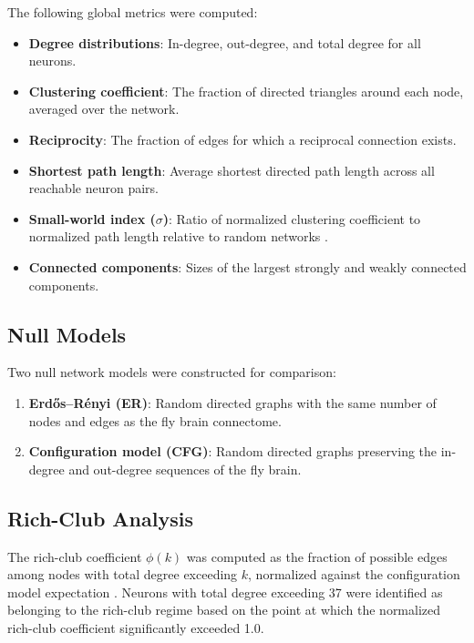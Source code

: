 \documentclass[11pt]{article}
\begin{document}
The following global metrics were computed:
\begin{itemize}
    \item \textbf{Degree distributions}: In-degree, out-degree, and total degree for all neurons.
    \item \textbf{Clustering coefficient}: The fraction of directed triangles around each node, averaged over the network.
    \item \textbf{Reciprocity}: The fraction of edges for which a reciprocal connection exists.
    \item \textbf{Shortest path length}: Average shortest directed path length across all reachable neuron pairs.
    \item \textbf{Small-world index ($\sigma$)}: Ratio of normalized clustering coefficient to normalized path length relative to random networks \citep{watts1998collective}.
    \item \textbf{Connected components}: Sizes of the largest strongly and weakly connected components.
\end{itemize}

\subsection{Null Models}

Two null network models were constructed for comparison:
\begin{enumerate}
    \item \textbf{Erd\H{o}s--R\'{e}nyi (ER)}: Random directed graphs with the same number of nodes and edges as the fly brain connectome.
    \item \textbf{Configuration model (CFG)}: Random directed graphs preserving the in-degree and out-degree sequences of the fly brain.
\end{enumerate}

\subsection{Rich-Club Analysis}

The rich-club coefficient $\phi(k)$ was computed as the fraction of possible edges among nodes with total degree exceeding $k$, normalized against the configuration model expectation \citep{colizza2006detecting, vandenheuvel2011rich}. Neurons with total degree exceeding 37 were identified as belonging to the rich-club regime based on the point at which the normalized rich-club coefficient significantly exceeded 1.0.
\end{document}
